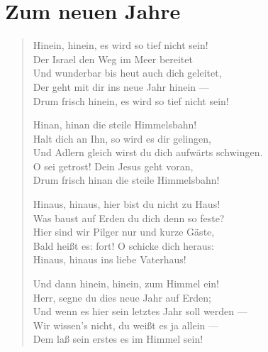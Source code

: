 \chapter[Zum neuen Jahre]{Zum neuen Jahre}

\begin{verse}
Hinein, hinein, es wird so tief nicht sein!\\
Der Israel den Weg im Meer bereitet\\
Und wunderbar bis heut auch dich geleitet,\\
Der geht mit dir ins neue Jahr hinein —\\
Drum frisch hinein, es wird so tief nicht sein!

Hinan, hinan die steile Himmelsbahn!\\
Halt dich an Ihn, so wird es dir gelingen,\\
Und Adlern gleich wirst du dich aufwärts schwingen.\\
O sei getrost! Dein Jesus geht voran,\\
Drum frisch hinan die steile Himmelsbahn!

Hinaus, hinaus, hier bist du nicht zu Haus!\\
Was baust auf Erden du dich denn so feste?\\
Hier sind wir Pilger nur und kurze Gäste,\\
Bald heißt es: fort! O schicke dich heraus:\\
Hinaus, hinaus ins liebe Vaterhaus!

Und dann hinein, hinein, zum Himmel ein!\\
Herr, segne du dies neue Jahr auf Erden;\\
Und wenn es hier sein letztes Jahr soll werden —\\
Wir wissen’s nicht, du weißt es ja allein —\\
Dem laß sein erstes es im Himmel sein!
\end{verse}
